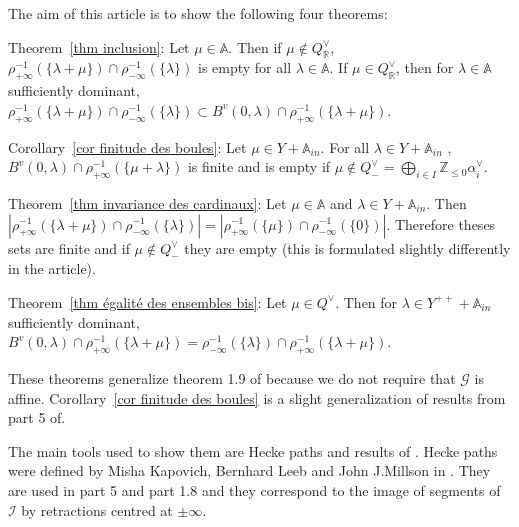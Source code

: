 \documentclass[12pt]{article}
\theoremstyle{plain}
\theoremstyle{definition}
\newcommand{\R}{\mathbb{R}}
\newcommand{\A}{\mathbb{A}}
\newcommand{\Z}{\mathbb{Z}}
\begin{document}
\vspace{3mm}
 The aim of this article is to show the following four theorems: 
\vspace{3mm}

Theorem~\ref{thm inclusion}:
Let $\mu\in \A$. Then if $\mu\notin Q_{\R}^\vee$, $\rho_{+\infty}^{-1}(\{\lambda+\mu\})\cap \rho_{-\infty}^{-1}(\{\lambda\})$ is empty for all $\lambda\in \A$. If $\mu\in Q^\vee_{\R}$, then for $\lambda\in \A$ sufficiently dominant, $\rho_{+\infty}^{-1}(\{\lambda+\mu\})\cap \rho_{-\infty}^{-1}(\{\lambda\})\subset B^v(0,\lambda)\cap \rho_{+\infty}^{-1}(\{\lambda+\mu\}) $. 

\vspace{3mm}
Corollary~\ref{cor finitude des boules}:
 Let $\mu\in Y+\A_{in}$. For all $\lambda\in Y+\A_{in}$ , $B^v(0,\lambda)\cap \rho_{+\infty}^{-1}(\{\mu+\lambda\})$ is finite and is empty if $\mu\notin Q^\vee_-=\bigoplus _{i\in I}\Z_{\leq 0}\alpha_i^\vee$.

\vspace{3mm}
Theorem~\ref{thm invariance des cardinaux}: 
Let $\mu\in \A$ and $\lambda\in Y+\A_{in}$. Then $|\rho_{+\infty}^{-1}(\{\lambda+\mu\})\cap\rho_{-\infty}^{-1}(\{\lambda\})|=|\rho_{+\infty}^{-1}(\{\mu\})\cap\rho_{-\infty}^{-1}(\{0\})|$. Therefore theses sets are finite and if $\mu\notin Q^\vee_-$ they are empty (this is formulated slightly differently in the article).

\vspace{3mm}
Theorem~\ref{thm égalité des ensembles bis}:
 Let $\mu\in Q^\vee$. Then for $\lambda\in Y^{++}+\A_{in}$ sufficiently dominant, $B^v(0,\lambda)\cap \rho_{+\infty}^{-1}(\{\lambda+\mu\})=\rho_{-\infty}^{-1}(\{\lambda\})\cap\rho_{+\infty}^{-1}(\{\lambda+\mu\})$.
\vspace{3mm}

These theorems generalize theorem 1.9 of \cite{braverman2014affine} because we do not require that $\mathcal{G}$ is affine. Corollary~\ref{cor finitude des boules} is a slight generalization of results from part 5 of\cite{gaussent2008kac}.
\vspace{3mm}


The main tools used to show them are Hecke paths and results of \cite{gaussent2014spherical}. Hecke paths were defined by Misha Kapovich, Bernhard Leeb and John J.Millson in \cite{kapovich2002generalized}. They are used in \cite{gaussent2008kac} part 5 and \cite{gaussent2014spherical} part 1.8 and they correspond to the image of segments of $\mathcal{I}$ by retractions centred at $\pm\infty$.
\end{document}
